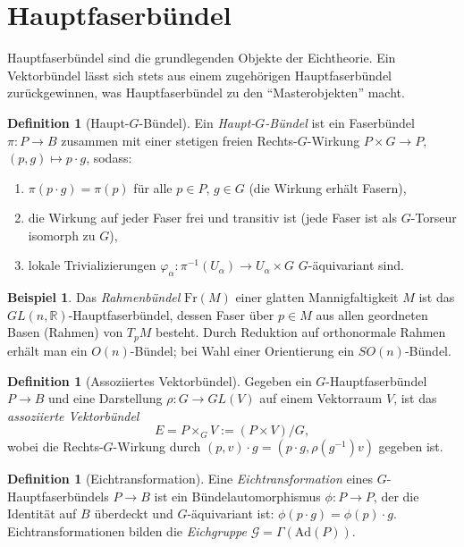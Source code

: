 \documentclass[12pt,a4paper]{amsart}
\theoremstyle{definition}
\newtheorem{definition}[theorem]{Definition}
\newtheorem{example}[theorem]{Beispiel}
\begin{document}
\section{Hauptfaserbündel}
\label{sec:haupt}

Hauptfaserbündel sind die grundlegenden Objekte der Eichtheorie. Ein Vektorbündel
lässt sich stets aus einem zugehörigen Hauptfaserbündel zurückgewinnen, was
Hauptfaserbündel zu den ``Masterobjekten'' macht.

\begin{definition}[Haupt-$G$-Bündel]
Ein \emph{Haupt-$G$-Bündel} ist ein Faserbündel $\pi \colon P \to B$ zusammen
mit einer stetigen freien Rechts-$G$-Wirkung $P \times G \to P$,
$(p, g) \mapsto p \cdot g$, sodass:
\begin{enumerate}[noitemsep]
  \item $\pi(p \cdot g) = \pi(p)$ für alle $p \in P$, $g \in G$
        (die Wirkung erhält Fasern),
  \item die Wirkung auf jeder Faser frei und transitiv ist
        (jede Faser ist als $G$-Torseur isomorph zu $G$),
  \item lokale Trivializierungen $\varphi_\alpha \colon \pi^{-1}(U_\alpha) \to
        U_\alpha \times G$ $G$-äquivariant sind.
\end{enumerate}
\end{definition}

\begin{example}
Das \emph{Rahmenbündel} $\mathrm{Fr}(M)$ einer glatten Mannigfaltigkeit $M$ ist
das $GL(n,\mathbb{R})$-Hauptfaserbündel, dessen Faser über $p \in M$ aus allen
geordneten Basen (Rahmen) von $T_pM$ besteht. Durch Reduktion auf orthonormale
Rahmen erhält man ein $O(n)$-Bündel; bei Wahl einer Orientierung ein $SO(n)$-Bündel.
\end{example}

\begin{definition}[Assoziiertes Vektorbündel]
Gegeben ein $G$-Hauptfaserbündel $P \to B$ und eine Darstellung
$\rho \colon G \to GL(V)$ auf einem Vektorraum $V$, ist das
\emph{assoziierte Vektorbündel}
\[
  E = P \times_G V := (P \times V) / G,
\]
wobei die Rechts-$G$-Wirkung durch $(p, v) \cdot g = (p \cdot g, \rho(g^{-1}) v)$
gegeben ist.
\end{definition}

\begin{definition}[Eichtransformation]
Eine \emph{Eichtransformation} eines $G$-Hauptfaserbündels $P \to B$ ist ein
Bündelautomorphismus $\phi \colon P \to P$, der die Identität auf $B$ überdeckt
und $G$-äquivariant ist: $\phi(p \cdot g) = \phi(p) \cdot g$. Eichtransformationen
bilden die \emph{Eichgruppe} $\mathcal{G} = \Gamma(\mathrm{Ad}(P))$.
\end{definition}
\end{document}
